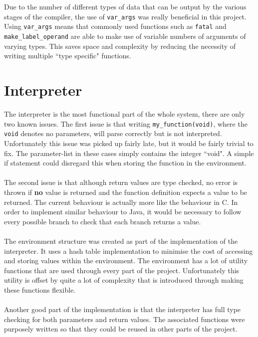 \ \\ \ \\
Due to the number of different types of data that can be output by the various stages of the compiler, the use of \verb!var_args! was really beneficial in this project. Using \verb!var_args! means that commonly used functions such as \verb!fatal! and \verb!make_label_operand! are able to make use of variable numbers of arguments of varying types. This saves space and complexity by reducing the necessity of writing multiple ``type specific" functions.

\section{Interpreter}
The interpreter is the most functional part of the whole system, there are only two known issues. The first issue is that writing \verb!my_function(void)!, where the \verb!void! denotes no parameters, will parse correctly but is not interpreted. Unfortunately this issue was picked up fairly late, but it would be fairly trivial to fix. The parameter-list in these cases simply contains the integer ``void". A simple if statement could disregard this when storing the function in the environment.
\ \\ \ \\
The second issue is that although return values are type checked, no error is thrown if \textbf{no} value is returned and the function definition expects a value to be returned. The current behaviour is actually more like the behaviour in C. In order to implement similar behaviour to Java, it would be necessary to follow every possible branch to check that each branch returns a value.
\ \\ \ \\
The environment structure was created as part of the implementation of the interpreter. It uses a hash table implementation to minimise the cost of accessing and storing values within the environment. The environment has a lot of utility functions that are used through every part of the project. Unfortunately this utility is offset by quite a lot of complexity that is introduced through making these functions flexible.
\ \\ \ \\
Another good part of the implementation is that the interpreter has full type checking for both parameters and return values. The associated functions were purposely written so that they could be reused in other parts of the project. 
